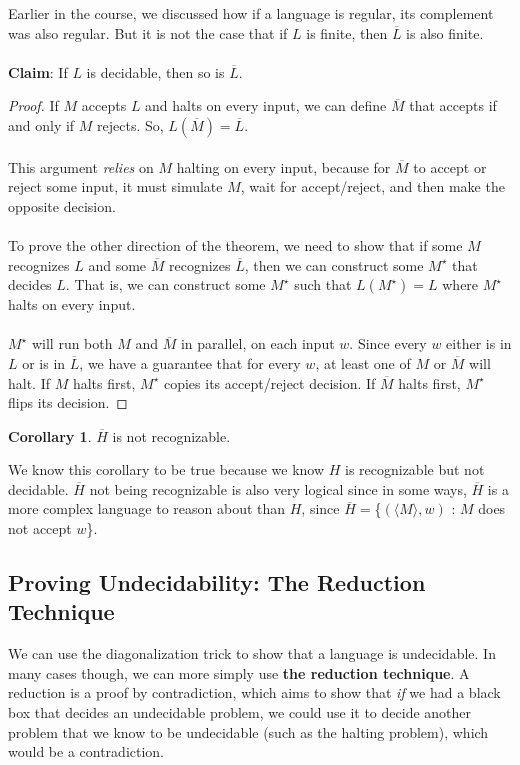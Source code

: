 \documentclass[]{article}
\theoremstyle{definition}
\newtheorem*{corollary}{Corollary}
\begin{document}
      Earlier in the course, we discussed how if a language is regular, its complement was also regular. But it is not the case that if $L$ is finite, then $\overline{L}$ is also finite.
      \\ \\
      \textbf{Claim}: If $L$ is decidable, then so is $\overline{L}$.
      \begin{proof}
        If $M$ accepts $L$ and halts on every input, we can define $\overline{M}$ that accepts if and only if $M$ rejects. So, $L(\overline{M}) = \overline{L}$.
        \\ \\
        This argument \emph{relies} on $M$ halting on every input, because for $\overline{M}$ to accept or reject some input, it must simulate $M$, wait for accept/reject, and then make the opposite decision.
        \\ \\
        To prove the other direction of the theorem, we need to show that if some $M$ recognizes $L$ and some $\overline{M}$ recognizes $\overline{L}$, then we can construct some $M^\star$ that decides $L$. That is, we can construct some $M^\star$ such that $L(M^\star) = L$ where $M^\star$ halts on every input.
        \\ \\
        $M^\star$ will run both $M$ and $\overline{M}$ in parallel, on each input $w$. Since every $w$ either is in $L$ or is in $\overline{L}$, we have a guarantee that for every $w$, at least one of $M$ or $\overline{M}$ will halt. If $M$ halts first, $M^\star$ copies its accept/reject decision. If $\overline{M}$ halts first, $M^\star$ flips its decision.
      \end{proof}

      \begin{corollary}
        $\overline{H}$ is not recognizable.
      \end{corollary}

      We know this corollary to be true because we know $H$ is recognizable but not decidable. $\overline{H}$ not being recognizable is also very logical since in some ways, $\overline{H}$ is a more complex language to reason about than $H$, since $\overline{H} = $\{$(\langle M \rangle, w)$ : $M$ does not accept $w$\}.

    \subsection{Proving Undecidability: The Reduction Technique}
      We can use the diagonalization trick to show that a language is undecidable. In many cases though, we can more simply use \textbf{the reduction technique}. A reduction is a proof by contradiction, which aims to show that \emph{if} we had a black box that decides an undecidable problem, we could use it to decide another problem that we know to be undecidable (such as the halting problem), which would be a contradiction.
\end{document}
